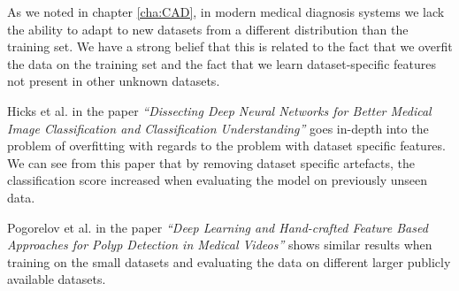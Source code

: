 As we noted in chapter \ref{cha:CAD}, in modern medical diagnosis systems we lack the ability to adapt to new datasets from a different distribution than the training set. We have a strong belief that this is related to the fact that we overfit the data on the training set and the fact that we learn dataset-specific features not present in other unknown datasets.


Hicks et al. in the paper \textit{``Dissecting Deep Neural Networks for Better Medical Image Classification and Classification Understanding''} goes in-depth into the problem of overfitting with regards to the problem with dataset specific features. We can see from this paper that by removing dataset specific artefacts, the classification score increased when evaluating the model on previously unseen data.

Pogorelov et al. in the paper \textit{``Deep Learning and Hand-crafted Feature Based Approaches for Polyp Detection in Medical Videos''} shows similar results when training on the small datasets and evaluating the data on different larger publicly available datasets.

